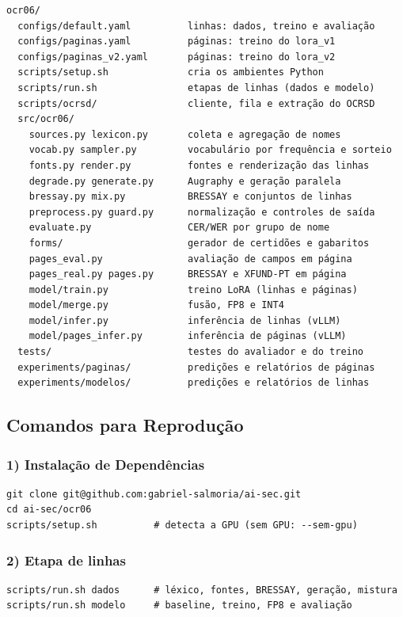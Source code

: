 \documentclass[12pt,a4paper]{article}
\begin{document}
{\small
\begin{verbatim}
ocr06/
  configs/default.yaml          linhas: dados, treino e avaliação
  configs/paginas.yaml          páginas: treino do lora_v1
  configs/paginas_v2.yaml       páginas: treino do lora_v2
  scripts/setup.sh              cria os ambientes Python
  scripts/run.sh                etapas de linhas (dados e modelo)
  scripts/ocrsd/                cliente, fila e extração do OCRSD
  src/ocr06/
    sources.py lexicon.py       coleta e agregação de nomes
    vocab.py sampler.py         vocabulário por frequência e sorteio
    fonts.py render.py          fontes e renderização das linhas
    degrade.py generate.py      Augraphy e geração paralela
    bressay.py mix.py           BRESSAY e conjuntos de linhas
    preprocess.py guard.py      normalização e controles de saída
    evaluate.py                 CER/WER por grupo de nome
    forms/                      gerador de certidões e gabaritos
    pages_eval.py               avaliação de campos em página
    pages_real.py pages.py      BRESSAY e XFUND-PT em página
    model/train.py              treino LoRA (linhas e páginas)
    model/merge.py              fusão, FP8 e INT4
    model/infer.py              inferência de linhas (vLLM)
    model/pages_infer.py        inferência de páginas (vLLM)
  tests/                        testes do avaliador e do treino
  experiments/paginas/          predições e relatórios de páginas
  experiments/modelos/          predições e relatórios de linhas
\end{verbatim}
}

\subsection{Comandos para Reprodução}

\subsubsection*{1) Instalação de Dependências}
{\footnotesize
\begin{verbatim}
git clone git@github.com:gabriel-salmoria/ai-sec.git
cd ai-sec/ocr06
scripts/setup.sh          # detecta a GPU (sem GPU: --sem-gpu)
\end{verbatim}
}

\subsubsection*{2) Etapa de linhas}
{\footnotesize
\begin{verbatim}
scripts/run.sh dados      # léxico, fontes, BRESSAY, geração, mistura
scripts/run.sh modelo     # baseline, treino, FP8 e avaliação
\end{verbatim}
}
\end{document}
